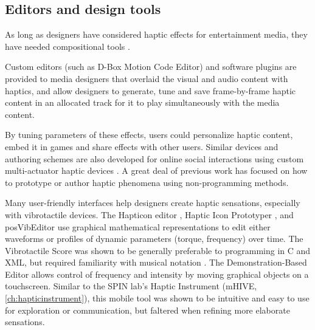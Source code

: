 \subsection{Editors and design tools}
As long as designers have considered haptic effects for entertainment media, they have needed compositional tools %
\cite{Gunther2002}.

Custom editors (such as D-Box Motion Code Editor) and software plugins are provided to media designers that overlaid the visual and audio content with haptics, and allow designers to generate, tune and save frame-by-frame haptic content in an allocated track for it to play simultaneously with the media content. 

By tuning parameters of these effects, users could personalize  haptic content, embed it in games and share effects with other users.
Similar devices and authoring schemes are also developed for online social interactions using custom multi-actuator haptic devices \cite{Kim2009,Tsetserukou2009,Paneels2013}.%
A great deal of previous work has focused on how to prototype or author haptic phenomena using non-programming methods. 

Many user-friendly interfaces help designers create %
haptic sensations, especially with vibrotactile devices.
The Hapticon editor \cite{Enriquez2003}, Haptic Icon Prototyper \cite{Swindells2006}, and posVibEditor \cite{Ryu2008} use graphical mathematical representations to edit either waveforms or profiles of dynamic parameters (torque, frequency) over time.
The Vibrotactile Score \cite{Lee2009} was shown to be generally preferable to programming in C and XML, but required familiarity with musical notation \cite{Lee2012}. 
The Demonstration-Based Editor \cite{Hong2013} allows control of frequency and intensity by moving graphical objects on a touchscreen.
Similar to the SPIN lab's Haptic Instrument (mHIVE, \autoref{ch:hapticinstrument}), this mobile tool was shown to be intuitive and easy to use for exploration or communication, but faltered when refining more elaborate sensations. %

